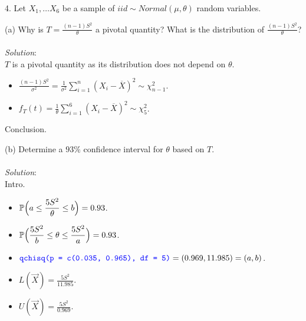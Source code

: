 \documentclass[12pt]{article}
\newcommand{\XB}{\color{black}}
\newcommand{\XBB}{\color{blue}}
\newcommand{\ds}{\displaystyle}
\begin{document}
4. Let $ X_{1}, \dots X_{6} $ be a sample of $ iid \sim Normal(\mu, \theta) $ random variables. \\

\XBB\hrulefill\XB 
\vspace{5mm} 

(a) Why is $ \ds T = \frac{(n-1)S^{2}}{\theta} $ a pivotal quantity? 
What is the distribution of $ \ds \frac{(n-1)S^{2}}{\theta} $? \\
\vspace{2.5mm} \\
\textit{Solution}:
\vspace{2.5mm} \\

\noindent
$ T $ is a pivotal quantity as its distribution does not depend on $ \theta $.

\begin{itemize}
    \item $ \ds \frac{(n-1)S^{2}}{\sigma^{2}} = \frac{1}{\sigma^{2}} \sum_{i=1}^{n} (X_{i} - \overline{X})^{2} \sim \chi_{n-1}^{2}  $. \\
    \item $ \ds f_{T}(t) = \frac{1}{\theta} \sum_{i=1}^{6} (X_{i} - \overline{X})^{2} \sim \chi_{5}^{2}  $. \\
\end{itemize}
\noindent
Conclusion. \\

\vspace{2.5mm}

(b) Determine a $ 93\% $ confidence interval for $ \theta $ based on $ T $. \\
\vspace{2.5mm} \\
\textit{Solution}:
\vspace{2.5mm} \\ 

\noindent
Intro. \\

\begin{itemize}
    \item $ \ds \mathbb{P} \Bigl( a \le \frac{5S^{2}}{\theta} \le b \Bigr) = 0.93 $. \\
    \item $ \ds \mathbb{P} \Bigl( \frac{5S^{2}}{b} \le \theta \le \frac{5S^{2}}{a} \Bigr) = 0.93 $. \\
    \item $ \ds {\XBB \texttt{qchisq(p = c(0.035, 0.965), df = 5)}} = (0.969, 11.985) = (a, b) $.
    \item $ \ds L(\overrightarrow{X}) = \frac{5S^{2}}{11.985} $. \\
    \item $ \ds U(\overrightarrow{X}) = \frac{5S^{2}}{0.969} $. \\
\end{itemize}
\end{document}
